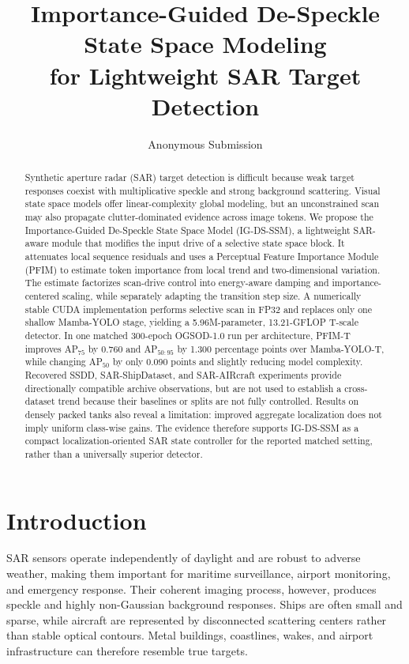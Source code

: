 \documentclass[letterpaper]{article}
\title{Importance-Guided De-Speckle State Space Modeling\\for Lightweight SAR Target Detection}
\author{Anonymous Submission}
\date{}
\newcommand{\method}{IG-DS-SSM}
\newcommand{\methodfull}{Importance-Guided De-Speckle State Space Model}
\newcommand{\apfifty}{AP$_{50}$}
\newcommand{\apcoco}{AP$_{50:95}$}
\begin{document}
\maketitle

\begin{abstract}
Synthetic aperture radar (SAR) target detection is difficult because weak target responses coexist with multiplicative speckle and strong background scattering. Visual state space models offer linear-complexity global modeling, but an unconstrained scan may also propagate clutter-dominated evidence across image tokens. We propose the \methodfull{} (\method), a lightweight SAR-aware module that modifies the input drive of a selective state space block. It attenuates local sequence residuals and uses a Perceptual Feature Importance Module (PFIM) to estimate token importance from local trend and two-dimensional variation. The estimate factorizes scan-drive control into energy-aware damping and importance-centered scaling, while separately adapting the transition step size. A numerically stable CUDA implementation performs selective scan in FP32 and replaces only one shallow Mamba-YOLO stage, yielding a 5.96M-parameter, 13.21-GFLOP T-scale detector. In one matched 300-epoch OGSOD-1.0 run per architecture, PFIM-T improves AP$_{75}$ by 0.760 and \apcoco{} by 1.300 percentage points over Mamba-YOLO-T, while changing \apfifty{} by only 0.090 points and slightly reducing model complexity. Recovered SSDD, SAR-ShipDataset, and SAR-AIRcraft experiments provide directionally compatible archive observations, but are not used to establish a cross-dataset trend because their baselines or splits are not fully controlled. Results on densely packed tanks also reveal a limitation: improved aggregate localization does not imply uniform class-wise gains. The evidence therefore supports \method{} as a compact localization-oriented SAR state controller for the reported matched setting, rather than a universally superior detector.
\end{abstract}

\section{Introduction}

SAR sensors operate independently of daylight and are robust to adverse weather, making them important for maritime surveillance, airport monitoring, and emergency response. Their coherent imaging process, however, produces speckle and highly non-Gaussian background responses. Ships are often small and sparse, while aircraft are represented by disconnected scattering centers rather than stable optical contours. Metal buildings, coastlines, wakes, and airport infrastructure can therefore resemble true targets.
\end{document}

